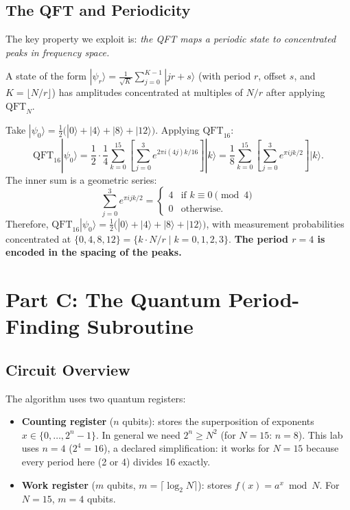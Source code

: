 \documentclass[a4paper,11pt]{article}
\providecommand{\ket}[1]{|#1\rangle}
\begin{document}
\subsection{The QFT and Periodicity}

The key property we exploit is: \emph{the QFT maps a periodic state to
concentrated peaks in frequency space.}

\begin{defbox}
A state of the form $\ket{\psi_r} = \frac{1}{\sqrt{K}} \sum_{j=0}^{K-1}
\ket{j r + s}$ (with period $r$, offset $s$, and $K = \lfloor N/r \rfloor$)
has amplitudes concentrated at multiples of $N/r$ after applying
$\text{QFT}_N$.
\end{defbox}

\begin{mathbox}[QFT of a Periodic State ($r=4$, $N=16$)]
Take $\ket{\psi_0} = \tfrac{1}{2}\bigl(\ket{0}+\ket{4}+\ket{8}+\ket{12}\bigr)$.
Applying $\text{QFT}_{16}$:
\[
    \text{QFT}_{16}\ket{\psi_0}
    = \frac{1}{2}\cdot\frac{1}{4}\sum_{k=0}^{15}
        \left[\sum_{j=0}^{3} e^{2\pi i (4j) k / 16}\right] \ket{k}
    = \frac{1}{8}\sum_{k=0}^{15}
        \left[\sum_{j=0}^{3} e^{\pi i j k / 2}\right] \ket{k}.
\]
The inner sum is a geometric series:
\[
    \sum_{j=0}^{3} e^{\pi i j k / 2} =
    \begin{cases}
        4 & \text{if } k \equiv 0 \pmod{4} \\
        0 & \text{otherwise.}
    \end{cases}
\]
Therefore, $\text{QFT}_{16}\ket{\psi_0} = \tfrac{1}{2}\bigl(\ket{0}+\ket{4}+\ket{8}+\ket{12}\bigr)$,
with measurement probabilities concentrated at $\{0, 4, 8, 12\} =
\{k \cdot N/r \mid k=0,1,2,3\}$. \textbf{The period $r=4$ is encoded in the
spacing of the peaks.}
\end{mathbox}

\newpage
\section{Part C: The Quantum Period-Finding Subroutine}

\subsection{Circuit Overview}

The algorithm uses two quantum registers:
\begin{itemize}
    \item \textbf{Counting register} ($n$ qubits): stores the superposition
    of exponents $x \in \{0, \ldots, 2^n - 1\}$. In general we need $2^n \geq N^2$
    (for $N=15$: $n = 8$). This lab uses $n=4$ ($2^4 = 16$), a declared
    simplification: it works for $N = 15$ because every period here (2 or 4)
    divides 16 exactly.
    \item \textbf{Work register} ($m$ qubits, $m = \lceil\log_2 N\rceil$):
    stores $f(x) = a^x \bmod N$. For $N=15$, $m=4$ qubits.
\end{itemize}
\end{document}
